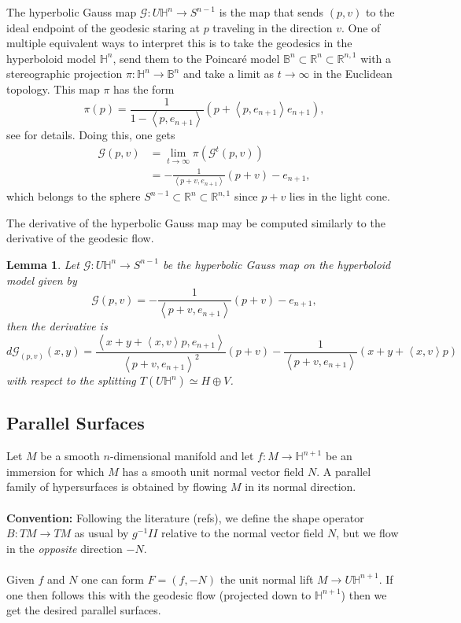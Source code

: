 \documentclass{amsart}
\newcommand{\R}{\mathbb{R}}
\newcommand{\two}{I\!\!I}
\newtheorem{lem}[thm]{Lemma}
\renewcommand{\H}{\mathbb{H}}
\begin{document}
The hyperbolic Gauss map $\mathcal{G}:U\H^n \to S^{n-1}$ is the map that sends $(p,v)$ to the ideal endpoint of the geodesic staring at $p$ traveling in the direction $v$. 
One of multiple equivalent ways to interpret this is to take the geodesics in the hyperboloid model $\H^n$, send them to the Poincar\'e model $\mathbb{B}^n \subset \R^n \subset \R^{n,1}$ with a stereographic projection $\pi: \H^n \to \mathbb{B}^n$ and take a limit as $t\to \infty$ in the Euclidean topology. 
This map $\pi$ has the form
\[
\pi(p) = \frac{1}{1 - \left< p, e_{n+1} \right>}(p + \left<p,e_{n+1}\right> e_{n+1}),
\]
see \cite{Lee2018} for details. 
Doing this, one gets 
\begin{align*}
\mathcal{G}(p,v) 
&= \lim_{t \to \infty} \pi(\mathcal{G}^t(p,v)) \\
&= -\frac{1}{\left<p+v,e_{n+1}\right>} (p+v) - e_{n+1},
\end{align*} 
which belongs to the sphere $S^{n-1} \subset \R^n \subset \R^{n,1}$ since $p+v$ lies in the light cone. 

The derivative of the hyperbolic Gauss map may be computed similarly to the derivative of the geodesic flow. 

\begin{lem}
Let $\mathcal{G}:U\H^n \to S^{n-1}$ be the hyperbolic Gauss map on the hyperboloid model given by 
\[
\mathcal{G}(p,v) = -\frac{1}{\left<p+v,e_{n+1}\right>}(p+v) - e_{n+1},
\]
then the derivative is 
\[
d\mathcal{G}_{(p,v)}(x,y)
=\frac{\left< x + y + \left<x,v\right>p, e_{n+1} \right>}{\left< p + v, e_{n+1} \right>^2}(p+v) - \frac{1}{\left< p + v, e_{n+1} \right>}(x + y + \left<x,v\right>p)
\]
with respect to the splitting $T(U\H^n) \simeq H \oplus V$.
\end{lem}

\subsection{Parallel Surfaces}

Let $M$ be a smooth $n$-dimensional manifold and let $f: M \to \H^{n+1}$ be an immersion for which $M$ has a smooth unit normal vector field $N$.
A parallel family of hypersurfaces is obtained by flowing $M$ in its normal direction. 
\\
\\
\noindent
{\bf Convention:} Following the literature (refs), we define the shape operator $B: TM \to TM$ as usual by $g^{-1}\two$ relative to the normal vector field $N$, but we flow in the \emph{opposite} direction $-N$. 
\\
\\
Given $f$ and $N$ one can form $F = (f ,-N)$ the unit normal lift $M \to U\H^{n+1}$.
If one then follows this with the geodesic flow (projected down to $\H^{n+1}$) then we get the desired parallel surfaces.
\end{document}
